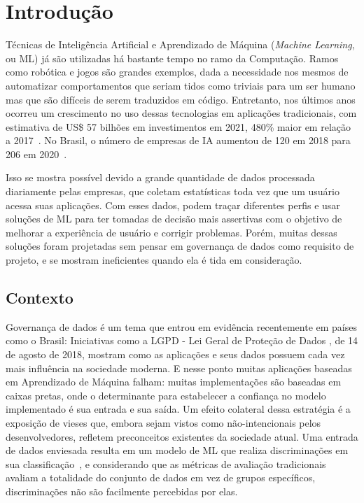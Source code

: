 \documentclass[Portugues,Final]{ic-tese-v3}
\begin{document}
\fimdaspaginasiniciais

\chapter{Introdução}


Técnicas de Inteligência Artificial e Aprendizado de Máquina (\textit{Machine Learning}, ou ML) já são utilizadas há bastante tempo no ramo da Computação. Ramos como robótica e jogos são grandes exemplos, dada a necessidade nos mesmos de automatizar comportamentos que seriam tidos como triviais para um ser humano mas que são difíceis de serem traduzidos em código. Entretanto, nos últimos anos ocorreu um crescimento no uso dessas tecnologias em aplicações tradicionais, com estimativa de US\$ 57 bilhões em investimentos em 2021, 480\% maior em relação a 2017~\cite{Deloitte_2018}. No Brasil, o número de empresas de IA aumentou de 120 em 2018 para 206 em 2020~\cite{CIO_2021}.

Isso se mostra possível devido a grande quantidade de dados processada diariamente pelas empresas, que coletam estatísticas toda vez que um usuário acessa suas aplicações. Com esses dados, podem traçar diferentes perfis e usar soluções de ML para ter tomadas de decisão mais assertivas com o objetivo de melhorar a experiência de usuário e corrigir problemas. Porém, muitas dessas soluções foram projetadas sem pensar em governança de dados como requisito de projeto, e se mostram ineficientes quando ela é tida em consideração.

\section{Contexto}

Governança de dados é um tema que entrou em evidência recentemente em países como o Brasil: Iniciativas como a LGPD - Lei Geral de Proteção de Dados \cite{LGPD_2021}, de 14 de agosto de 2018, mostram como as aplicações e seus dados possuem cada vez mais influência na sociedade moderna. E nesse ponto muitas aplicações baseadas em Aprendizado de Máquina falham: muitas implementações são baseadas em caixas pretas, onde o determinante para estabelecer a confiança no modelo implementado é sua entrada e sua saída. Um efeito colateral dessa estratégia é a exposição de vieses que, embora sejam vistos como não-intencionais pelos desenvolvedores, refletem preconceitos existentes da sociedade atual. Uma entrada de dados enviesada resulta em um modelo de ML que realiza discriminações em sua classificação~\cite{Buolamwini_2018}, e considerando que as métricas de avaliação tradicionais avaliam a totalidade do conjunto de dados em vez de grupos específicos, discriminações não são facilmente percebidas por elas.
\end{document}

